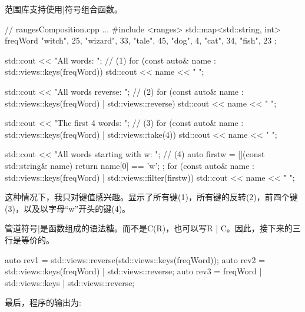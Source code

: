 范围库支持使用|符号组合函数。


\begin{cpp}
// rangesComposition.cpp
...
#include <ranges>
std::map<std::string, int> freqWord{ {"witch", 25}, {"wizard", 33}, {"tale", 45},
									 {"dog", 4}, {"cat", 34}, {"fish", 23} };

std::cout << "All words: "; // (1)
for (const auto& name : std::views::keys(freqWord)) { std::cout << name << " "; } \

std::cout << "All words reverse: "; // (2)
for (const auto& name : std::views::keys(freqWord) | std::views::reverse) {
	std::cout << name << " ";
}

std::cout << "The first 4 words: "; // (3)
for (const auto& name : std::views::keys(freqWord) | std::views::take(4)) {
	std::cout << name << " ";
}

std::cout << "All words starting with w: "; // (4)
auto firstw = [](const std::string& name){ return name[0] == 'w'; };
for (const auto& name : std::views::keys(freqWord) | std::views::filter(firstw)) {
	std::cout << name << " ";
}
\end{cpp}

这种情况下，我只对键值感兴趣。显示了所有键(1)，所有键的反转(2)，前四个键(3)，以及以字母“w”开头的键(4)。

管道符号|是函数组成的语法糖。而不是C(R)，也可以写R | C。因此，接下来的三行是等价的。

\begin{cpp}
auto rev1 = std::views::reverse(std::views::keys(freqWord));
auto rev2 = std::views::keys(freqWord) | std::views::reverse;
auto rev3 = freqWord | std::views::keys | std::views::reverse;
\end{cpp}

最后，程序的输出为:


















